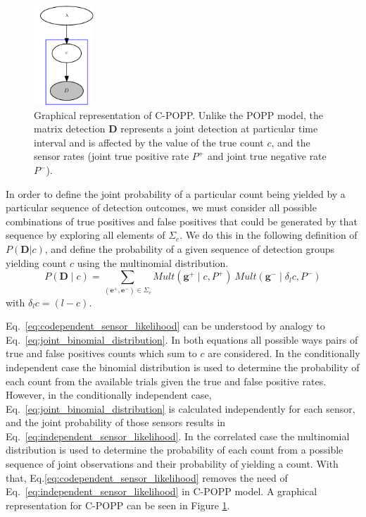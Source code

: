 \begin{figure}[t!]
	\centering
	\includegraphics[width=0.2\textwidth]{./figures/cpop-pics.pdf}
	\caption{Graphical representation of C-POPP. Unlike the POPP model, the matrix detection $\mathbf{D}$ represents a joint detection at particular time interval and is affected by the value of the true count $c$, and the sensor rates (joint true positive rate $P^+$ and joint true negative rate $P^-$).} %
	\label{fig:gm_cpopp}
	\vspace{-20pt}
\end{figure}

In order to define the joint probability of a particular count being yielded by a particular sequence of detection outcomes, we must consider all possible combinations of true positives and false positives that could be generated by that sequence by exploring all elements of $\Sigma_c$. We do this in the following definition of $P(\mathbf{D} | c)$, and define the probability of a given sequence of detection groups yielding count $c$ using the multinomial distribution.
\begin{equation}
\label{eq:codependent_sensor_likelihood}
P(\mathbf{D} \mid c) = \sum\limits_{(\mathbf{e}^+, \mathbf{e}^-) \in \Sigma_c} Mult(\mathbf{g}^+ \mid c, P^+) ~ Mult(\mathbf{g}^- \mid \delta_l c, P^-)
\end{equation}
\noindent with $\delta_l c = (l - c)$.

Eq.~\ref{eq:codependent_sensor_likelihood} can be understood by analogy to Eq.~\ref{eq:joint_binomial_distribution}. In both equations all possible ways pairs of true and false positives counts which sum to $c$ are considered. In the conditionally independent case the binomial distribution is used to determine the probability of each count from the available trials given the true and false positive rates. However, in the conditionally independent case, Eq.~\ref{eq:joint_binomial_distribution} is calculated independently for each sensor, and the joint probability of those sensors results in Eq.~\ref{eq:independent_sensor_likelihood}. In the correlated case the multinomial distribution is used to determine the probability of each count from a possible sequence of joint observations and their probability of yielding a count. With that, Eq.\ref{eq:codependent_sensor_likelihood} removes the need of Eq.~\ref{eq:independent_sensor_likelihood} in C-POPP model. A graphical representation for C-POPP can be seen in Figure \ref{fig:gm_cpopp}.

